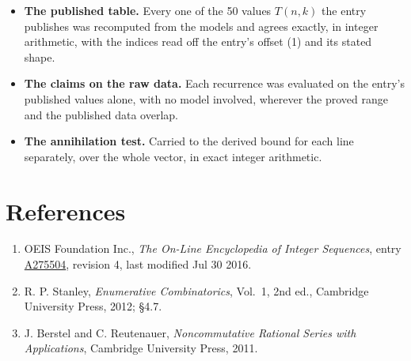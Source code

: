 \documentclass[11pt]{article}
\theoremstyle{definition}
\begin{document}
\begin{itemize}

\item {\bfseries The published table.} Every one of the 50 values $T(n,k)$ the entry publishes was recomputed from the models and agrees exactly, in integer arithmetic, with the indices read off the entry's offset (1) and its stated shape.

\item {\bfseries The claims on the raw data.} Each recurrence was evaluated on the entry's published values alone, with no model involved, wherever the proved range and the published data overlap.

\item {\bfseries The annihilation test.} Carried to the derived bound for each line separately, over the whole vector, in exact integer arithmetic.

\end{itemize}

\section{References}

\begin{enumerate}

\item OEIS Foundation Inc., \emph{The On-Line Encyclopedia of Integer Sequences}, entry \href{https://oeis.org/A275504}{A275504}, revision 4, last modified Jul 30 2016.

\item R. P. Stanley, \emph{Enumerative Combinatorics}, Vol.~1, 2nd ed., Cambridge University Press, 2012; \S4.7.

\item J. Berstel and C. Reutenauer, \emph{Noncommutative Rational Series with Applications}, Cambridge University Press, 2011.

\end{enumerate}
\end{document}
